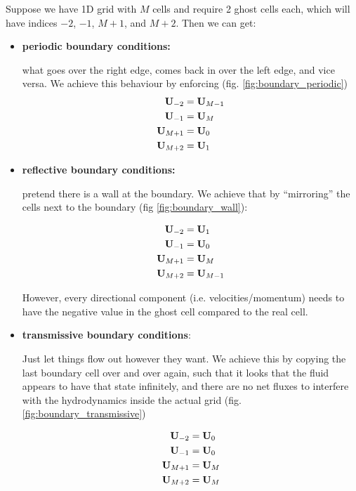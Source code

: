 Suppose we have 1D grid with $M$ cells and require 2 ghost cells each, which will have indices $-2$, $-1$, $M+1$, and $M+2$.
Then we can get:

\begin{itemize}
	\item \textbf{periodic boundary conditions:}
	
		what goes over the right edge, comes back in over the left edge, and vice versa.
		We achieve this behaviour by enforcing (fig. \ref{fig:boundary_periodic})
		\begin{align*}
			\mathbf{U}_{-2} &= \mathbf{U}_{M-1} \\
			\mathbf{U}_{-1} &= \mathbf{U}_{M}	\\
			\mathbf{U}_{M+1} &= \mathbf{U}_0 	\\
			\mathbf{U}_{M+2} &= \mathbf{U}_1 	\\
		\end{align*}
		
		
		
	\item \textbf{reflective boundary conditions:}
	
		pretend there is a wall at the boundary. 
		We achieve that by ``mirroring'' the cells next to the boundary (fig \ref{fig:boundary_wall}):

		\begin{align*}
			\mathbf{U}_{-2} &= \mathbf{U}_1		\\
			\mathbf{U}_{-1} &= \mathbf{U}_0		\\
			\mathbf{U}_{M+1} &= \mathbf{U}_{M}	\\
			\mathbf{U}_{M+2} &= \mathbf{U}_{M-1}\\
		\end{align*}
		
		However, every directional component (i.e. velocities/momentum) needs to have the negative value in the ghost cell compared to the real cell.
	
	
	\item \textbf{transmissive boundary conditions}:
	
		Just let things flow out however they want. 
		We achieve this by copying the last boundary cell over and over again, such that it looks that the fluid appears to have that state infinitely, and there are no net fluxes to interfere with the hydrodynamics inside the actual grid (fig. \ref{fig:boundary_transmissive})
		
		
		\begin{align*}
			\mathbf{U}_{-2} &= \mathbf{U}_0		\\
			\mathbf{U}_{-1} &= \mathbf{U}_0		\\
			\mathbf{U}_{M+1} &= \mathbf{U}_{M}	\\
			\mathbf{U}_{M+2} &= \mathbf{U}_{M}	\\
		\end{align*}	
	
\end{itemize}



